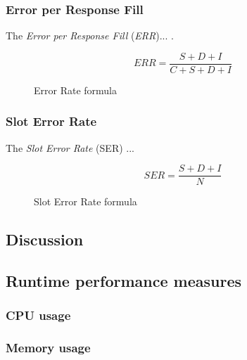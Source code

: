 \subsubsection{Error per Response Fill}
The \textit{Error per Response Fill} (\textit{ERR})... \cite{Chinchor:1995}.

\begin{figure}[H]
\begin{displaymath}
	\textit{ERR} = \frac{S+D+I}{C+S+D+I}
\end{displaymath}
\caption{Error Rate formula}
\end{figure}

\subsubsection{Slot Error Rate}
The \textit{Slot Error Rate} (SER) ... 

\begin{figure}[H]
\begin{displaymath}
	SER = \frac{S+D+I}{N}
\end{displaymath}
\caption{Slot Error Rate formula}
\end{figure}

\subsection{Discussion}

\subsection{Runtime performance measures}

\subsubsection{CPU usage}
\subsubsection{Memory usage}